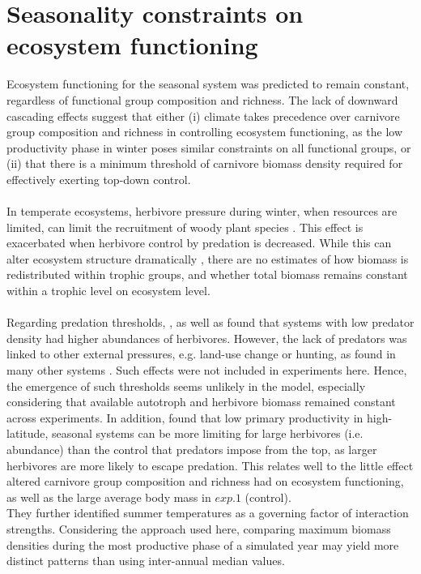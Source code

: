 \section{Seasonality constraints on ecosystem functioning}
Ecosystem functioning for the seasonal system was predicted to remain constant, regardless of functional group composition and richness. The lack of downward cascading effects suggest that either (i) climate takes precedence over carnivore group composition and richness in controlling ecosystem functioning, as the low productivity phase in winter poses similar constraints on all functional groups, or (ii) that there is a minimum threshold of carnivore biomass density required for effectively exerting top-down control.\\\\
In temperate ecosystems, herbivore pressure during winter, when resources are limited, can limit the recruitment of woody plant species \citep{Ripple2014}.
 This effect is exacerbated when herbivore control by predation is decreased. 
While this can alter ecosystem structure dramatically \citep{Terborgh2001, Estes2011}, there are no estimates of how biomass is redistributed within trophic groups, and whether total biomass remains constant within a trophic level on ecosystem level. \\\\
Regarding predation thresholds, \cite{Ripple2012}, as well as \cite{Johnson2009} found that systems with low predator density had higher abundances of herbivores. However, the lack of predators was linked to other external pressures, e.g. land-use change or hunting, as found in many other systems \citep{Estes2011,Ripple2014}. Such effects were not included in experiments here. Hence, the emergence of such thresholds seems unlikely in the model, especially considering that available autotroph and herbivore biomass remained constant across experiments. In addition,  \cite{Legagneux2014} found that low primary productivity in high-latitude, seasonal systems can be more limiting for large herbivores (i.e. abundance) than the control that predators impose from the top, as larger herbivores are more likely to escape predation. 
This relates well to the little effect altered carnivore group composition and richness had on ecosystem functioning, as well as the large average body mass in $exp. 1$ (control). \\
They further identified summer temperatures as a governing factor of interaction strengths. Considering the approach used here, comparing maximum biomass densities during the most productive phase of a simulated year may yield more distinct patterns than using inter-annual median values.
